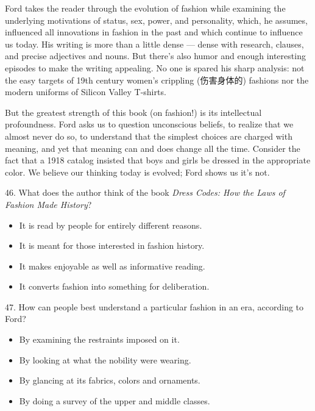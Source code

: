 \documentclass[UTF8,11pt]{ctexart}
\begin{document}
Ford takes the reader through the evolution of fashion while examining the underlying motivations of status, sex, power, and personality, which, he assumes, influenced all innovations in fashion in the past and which continue to influence us today. His writing is more than a little dense — dense with research, clauses, and precise adjectives and nouns. But there’s also humor and enough interesting episodes to make the writing appealing. No one is spared his sharp analysis: not the easy targets of 19th century women’s crippling (伤害身体的) fashions nor the modern uniforms of Silicon Valley T-shirts.


But the greatest strength of this book (on fashion!) is its intellectual profoundness. Ford asks us to question unconscious beliefs, to realize that we almost never do so, to understand that the simplest choices are charged with meaning, and yet that meaning can and does change all the time. Consider the fact that a 1918 catalog insisted that boys and girls be dressed in the appropriate color. We believe our thinking today is evolved; Ford shows us it’s not.


46. What does the author think of the book \textit{Dress Codes: How the Laws of Fashion Made History}?


\begin{itemize}[leftmargin=2em,itemsep=.2em,topsep=.4em]\item[A.] It is read by people for entirely different reasons.
\item[B.] It is meant for those interested in fashion history.
\item[C.] It makes enjoyable as well as informative reading.
\item[D.] It converts fashion into something for deliberation.
\end{itemize}

47. How can people best understand a particular fashion in an era, according to Ford?


\begin{itemize}[leftmargin=2em,itemsep=.2em,topsep=.4em]\item[A.] By examining the restraints imposed on it.
\item[B.] By looking at what the nobility were wearing.
\item[C.] By glancing at its fabrics, colors and ornaments.
\item[D.] By doing a survey of the upper and middle classes.
\end{itemize}
\end{document}

